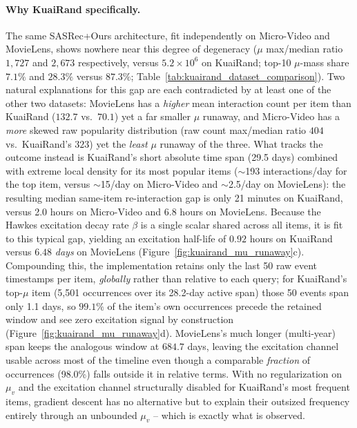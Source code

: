 \paragraph{Why KuaiRand specifically.} The same SASRec+Ours architecture, fit
independently on Micro-Video and MovieLens, shows nowhere near this degree of
degeneracy ($\mu$ max/median ratio $1{,}727$ and $2{,}673$ respectively, versus
$5.2\times 10^6$ on KuaiRand; top-10 $\mu$-mass share $7.1\%$ and $28.3\%$ versus
$87.3\%$; Table~\ref{tab:kuairand_dataset_comparison}). Two natural explanations for this
gap are each contradicted by at least one of the other two datasets: MovieLens has a
\emph{higher} mean interaction count per item than KuaiRand ($132.7$ vs.\ $70.1$) yet a
far smaller $\mu$ runaway, and Micro-Video has a \emph{more} skewed raw popularity
distribution (raw count max/median ratio $404$ vs.\ KuaiRand's $323$) yet the
\emph{least} $\mu$ runaway of the three. What tracks the outcome instead is KuaiRand's
short absolute time span (29.5 days) combined with extreme local density for its most
popular items ($\sim$193 interactions/day for the top item, versus $\sim$15/day on
Micro-Video and $\sim$2.5/day on MovieLens): the resulting median same-item
re-interaction gap is only 21 minutes on KuaiRand, versus 2.0 hours on Micro-Video and
6.8 hours on MovieLens. Because the Hawkes excitation decay rate $\beta$ is a single
scalar shared across all items, it is fit to this typical gap, yielding an excitation
half-life of $0.92$ hours on KuaiRand versus $6.48$ \emph{days} on MovieLens
(Figure~\ref{fig:kuairand_mu_runaway}c). Compounding this, the implementation retains
only the last 50 raw event timestamps per item, \emph{globally} rather than relative to
each query; for KuaiRand's top-$\mu$ item (5{,}501 occurrences over its 28.2-day active
span) those 50 events span only 1.1 days, so $99.1\%$ of the item's own occurrences
precede the retained window and see zero excitation signal by construction
(Figure~\ref{fig:kuairand_mu_runaway}d). MovieLens's much longer (multi-year) span keeps
the analogous window at $684.7$ days, leaving the excitation channel usable across most
of the timeline even though a comparable \emph{fraction} of occurrences (98.0\%) falls
outside it in relative terms. With no regularization on $\mu_v$ and the excitation
channel structurally disabled for KuaiRand's most frequent items, gradient descent has no
alternative but to explain their outsized frequency entirely through an unbounded
$\mu_v$ -- which is exactly what is observed.

